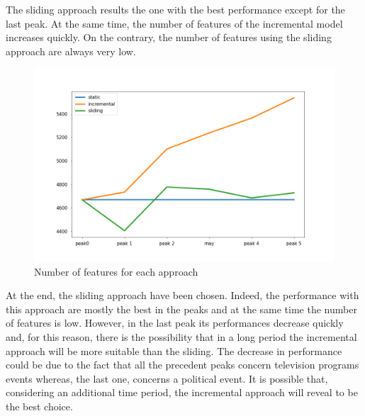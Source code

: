\noindent
The sliding approach results the one with the best performance except for the last peak. At the same time, the number of features of the incremental model increases quickly. On the contrary, the number of features using the sliding approach are always very low. 

\begin{figure}[H]
    \centering
    \includegraphics[width= 1\textwidth]{images/monitoring/features_for_model.png}
    \caption{Number of features for each approach} 
    \label{online-monitoring-features}
\end{figure}

\noindent
At the end, the sliding approach have been chosen. Indeed, the performance with this approach are mostly the best in the peaks and at the same time the number of features is low. However, in the last peak its performances decrease quickly and, for this reason, there is the possibility that in a long period the incremental approach will be more suitable than the sliding. The decrease in performance could be due to the fact that all the precedent peaks concern television programs events whereas, the last one, concerns a political event. It is possible that, considering an additional time period, the incremental approach will reveal to be the best choice.  

